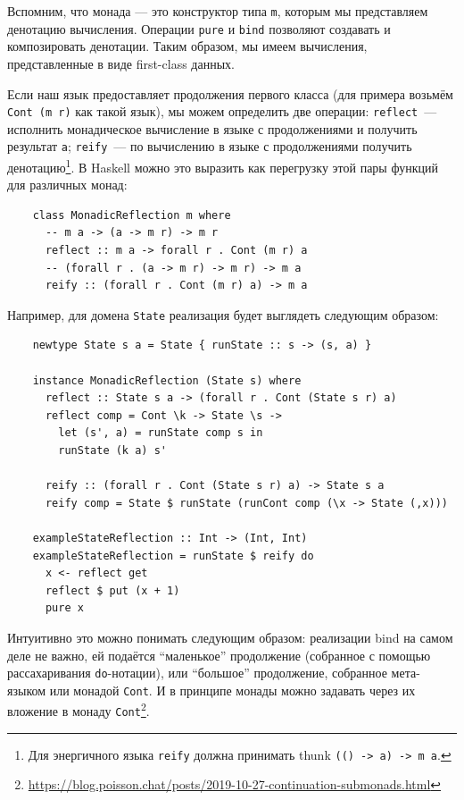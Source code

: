 Вспомним, что монада --- это конструктор типа \texttt{m}, которым мы представляем денотацию вычисления.
Операции \texttt{pure} и \texttt{bind} позволяют создавать и композировать денотации.
Таким образом, мы имеем вычисления, представленные в виде first-class данных.

Если наш язык предоставляет продолжения первого класса (для примера возьмём \texttt{Cont (m r)} как такой язык), мы можем определить две операции: \texttt{reflect}~--- исполнить монадическое вычисление в языке с продолжениями и получить результат \texttt{a}; \texttt{reify}~--- по вычислению в языке с продолжениями получить денотацию\footnote{Для энергичного языка \texttt{reify} должна принимать thunk \texttt{(() -> a) -> m a}.}.
В Haskell можно это выразить как перегрузку этой пары функций для различных монад:
\begin{verbatim}
    class MonadicReflection m where
      -- m a -> (a -> m r) -> m r
      reflect :: m a -> forall r . Cont (m r) a
      -- (forall r . (a -> m r) -> m r) -> m a
      reify :: (forall r . Cont (m r) a) -> m a
\end{verbatim}

Например, для домена \texttt{State} реализация будет выглядеть следующим образом:
\begin{verbatim}
    newtype State s a = State { runState :: s -> (s, a) }

    instance MonadicReflection (State s) where
      reflect :: State s a -> (forall r . Cont (State s r) a)
      reflect comp = Cont \k -> State \s ->
        let (s', a) = runState comp s in
        runState (k a) s'

      reify :: (forall r . Cont (State s r) a) -> State s a
      reify comp = State $ runState (runCont comp (\x -> State (,x)))

    exampleStateReflection :: Int -> (Int, Int)
    exampleStateReflection = runState $ reify do
      x <- reflect get
      reflect $ put (x + 1)
      pure x
\end{verbatim}


Интуитивно это можно понимать следующим образом: реализации bind на самом деле не важно, ей подаётся ``маленькое'' продолжение (собранное с помощью рассахаривания \texttt{do}-нотации), или ``большое'' продолжение, собранное мета-языком или монадой \texttt{Cont}.
И в принципе монады можно задавать через их вложение в монаду \texttt{Cont}\footnote{\url{https://blog.poisson.chat/posts/2019-10-27-continuation-submonads.html}}.

